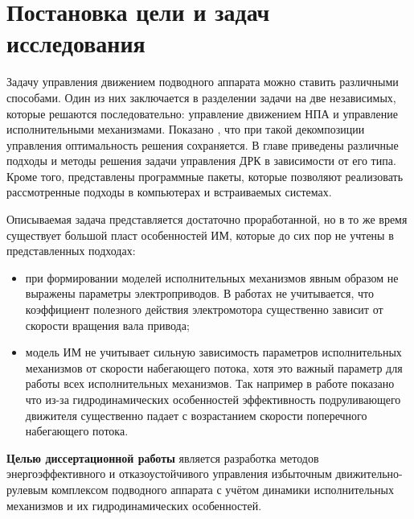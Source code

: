
\section{Постановка цели и задач исследования}\label{sec:Statement/SetProblems}

Задачу управления движением подводного аппарата можно ставить различными способами.
Один из них заключается в разделении задачи на две независимых, которые решаются последовательно: управление движением НПА и управление исполнительными механизмами.
Показано \cite{10.1016/j.automatica.2004.09.007}, что при такой декомпозиции управления оптимальность решения сохраняется.
В главе приведены различные подходы и методы решения задачи управления ДРК в зависимости от его типа.
Кроме того, представлены программные пакеты, которые позволяют реализовать рассмотренные подходы в компьютерах и встраиваемых системах. 

Описываемая задача представляется достаточно проработанной, но в то же время существует большой пласт особенностей ИМ, которые до сих пор не учтены в представленных подходах:
\begin{itemize}
    \item при формировании моделей исполнительных механизмов явным образом не выражены параметры электроприводов. В работах не учитывается, что коэффициент полезного действия электромотора существенно зависит от скорости вращения вала привода;
    \item модель ИМ не учитывает сильную зависимость параметров исполнительных механизмов от скорости набегающего потока, хотя это важный параметр для работы всех исполнительных механизмов. Так например в работе \cite{palmer2008modelling} показано что из-за гидродинамических особенностей эффективность подруливающего движителя существенно падает с возрастанием скорости поперечного набегающего потока.
\end{itemize}

\textbf{Целью диссертационной работы} является разработка методов энергоэффективного и отказоустойчивого управления избыточным движительно-рулевым комплексом подводного аппарата с учётом динамики исполнительных механизмов и их гидродинамических особенностей.

